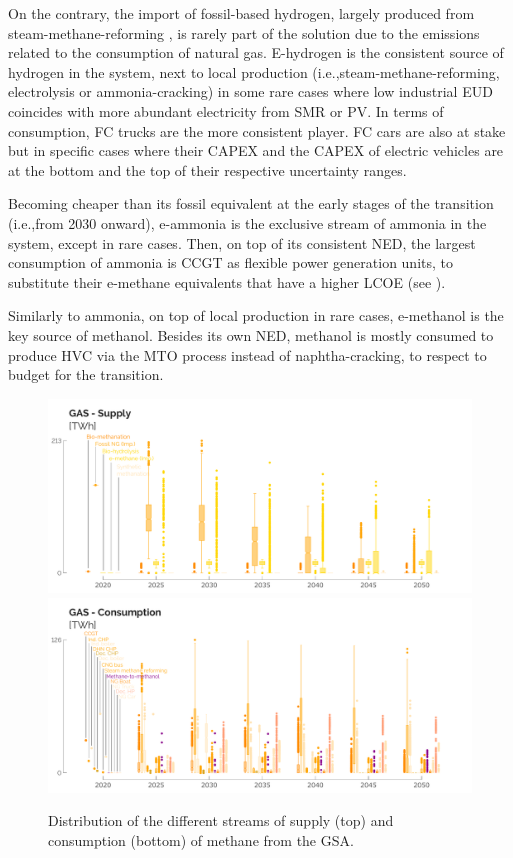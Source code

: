 \documentclass[11pt,twoside,a4paper,english]{article}
\def\ie{i.e.,}
\begin{document}
\begin{appendices}
On the contrary, the import of fossil-based hydrogen, largely produced from steam-methane-reforming \cite{spf_economie_h2}, is rarely part of the solution due to the emissions related to the consumption of natural gas. E-hydrogen is the consistent source of hydrogen in the system, next to local production (\ie steam-methane-reforming, electrolysis or ammonia-cracking) in some rare cases where low industrial \gls{EUD} coincides with more abundant electricity from \gls{SMR} or \gls{PV}. In terms of consumption, \gls{FC} trucks are the more consistent player. \gls{FC} cars are also at stake but in specific cases where their CAPEX and the CAPEX of electric vehicles are at the bottom and the top of their respective uncertainty ranges.

Becoming cheaper than its fossil equivalent at the early stages of the transition (\ie from 2030 onward), e-ammonia is the exclusive stream of ammonia in the system, except in rare cases. Then, on top of its consistent \gls{NED}, the largest consumption of ammonia is \gls{CCGT} as flexible power generation units, to substitute their e-methane equivalents that have a higher \gls{LCOE} (see ).

Similarly to ammonia, on top of local production in rare cases, e-methanol is the key source of methanol. Besides its own \gls{NED}, methanol is mostly consumed to produce \gls{HVC} via the \gls{MTO} process instead of naphtha-cracking, to respect to  budget for the transition.

\begin{figure}[p!]
\centering
\includegraphics[width=\textwidth]{UQ_Gas_Prod.pdf}
\includegraphics[width=\textwidth]{UQ_Gas_Cons.pdf}
\caption{Distribution of the different streams of supply (top) and consumption (bottom) of methane from the \acrfull{GSA}.}
\label{fig:results_uq_prod_cons_Gas}
\end{figure}


\end{appendices}
\end{document}
